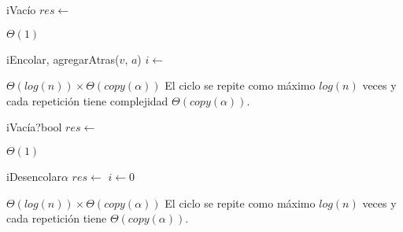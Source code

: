 \begin{Algoritmos}


  \begin{algoritmo}{iVac\'io}{}{}
    $res \gets$ \vacia{} 
  \end{algoritmo}
  \datosAlgoritmo{} %
  {} %
  {} %
  {$\Theta(1)$} %
  {} %

  \begin{algoritmo}{iEncolar}{, }{}
    agregarAtras($v$, $a$) 
     $i \gets$  
  \end{algoritmo}
  \datosAlgoritmo{} %
  {} %
  {} %
  {$\Theta(log(n)) \times \Theta(copy(\alpha))$} %
  {El ciclo se repite como m\'aximo $log(n)$ veces y cada repetici\'on tiene complejidad $\Theta(copy(\alpha))$. } %

  \begin{algoritmo}{iVac\'ia?}{}{bool}
    $res \gets$  
  \end{algoritmo}
  \datosAlgoritmo{} %
  {} %
  {} %
  {$\Theta(1)$} %
  {} %

  \begin{algoritmo}{iDesencolar}{}{$\alpha$}
    $res \gets$  
     $i \gets 0$ 
  \end{algoritmo}
  \datosAlgoritmo{} %
  {} %
  {} %
  {$\Theta(log(n)) \times \Theta(copy(\alpha))$} %
  {El ciclo se repite como m\'aximo $log(n)$ veces y cada repetici\'on tiene $\Theta(copy(\alpha))$. } %


\end{Algoritmos}
